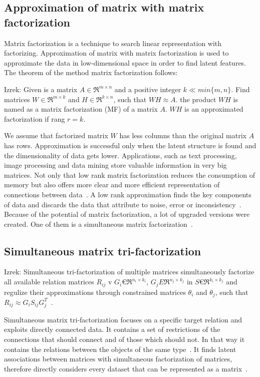 \documentclass{article} %
\begin{document}
\subsection{Approximation of matrix with matrix factorization}
Matrix factorization is a technique to search linear representation with 
factorizing. Approximation of matrix with matrix factorization is used to 
approximate the data in low-dimensional space in order to find latent features. 
The theorem of the method matrix factorization follows:

Izrek: Given is a matrix $A \in \Re^{m \times n}$ and a positive integer $k \ll 
min\{m,n\}$. Find matrices $W \in \Re^{m \times k}$ and $H \in \Re^{k \times 
n}$, such that $WH \approx A$. the product $WH$ is named as a matrix 
factorization (MF) of a matrix $A$. $WH$ is an approximated factorization if 
rang $r = k$.

We assume that factorized matrix $W$ has less columns than the original matrix $A$ 
has rows. Approximation is successful only when the latent structure is found 
and the dimensionality of data gets lower. Applications, such as text 
processing, image processing and data mining store valuable information in very 
big matrices. Not only that low rank matrix factorization reduces the 
consumption of memory but also offers more clear and more efficient 
representation of connections between data~\cite{neyshabur2013sparse}. A low 
rank approximation finds the key components of data and discards the data that 
attribute to noise, error or inconsistency~\cite{langville2014algorithms}. 
Because of the potential of matrix factorization, a lot of upgraded versions 
were created. One of them is a simultaneous matrix 
factorization~\cite{zitnik2015data}.

\subsection{Simultaneous matrix tri-factorization}
Izrek: Simultaneous tri-factorization of multiple matrices simultaneously 
factorize all available relation matrices $R_{ij}$ v $G_i € \Re^{n_i \times 
k_i}$, $G_j E \Re^{n_j \times k_j}$ in $S € \Re^{k_i \times k_j}$ and regulize 
their approximations through constrained matrices $\theta_i$ and $\theta_j$, 
such that $R_{ij} \approx G_iS_{ij}G_j^T$~\cite{zitnik2015data}. 

Simultaneous matrix tri-factorization focuses on a specific target relation and 
exploits directly connected data. It contains a set of restrictions of the 
connections that should connect and of those which should not. In that way it 
contains the relations between the objects of the same 
type~\cite{zitnik2015data}. It finds latent associations between matrices with 
simultaneous factorization of matrices, therefore directly considers every 
dataset that can be represented as a matrix~\cite{zitnik2015data}.
\end{document}
